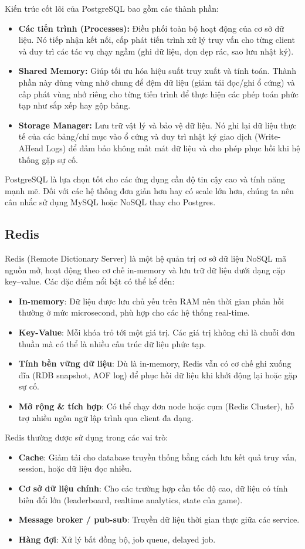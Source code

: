 Kiến trúc cốt lõi của PostgreSQL bao gồm các thành phần:
\begin{itemize}
    \item \textbf{Các tiến trình (Processes):} Điều phối toàn bộ hoạt động của cơ sở dữ liệu. Nó tiếp nhận kết nối, cấp phát tiến trình xử lý truy vấn cho từng client và duy trì các tác vụ chạy ngầm (ghi dữ liệu, dọn dẹp rác, sao lưu nhật ký).
    \item \textbf{Shared Memory:} Giúp tối ưu hóa hiệu suất truy xuất và tính toán. Thành phần này dùng vùng nhớ chung để đệm dữ liệu (giảm tải đọc/ghi ổ cứng) và cấp phát vùng nhớ riêng cho từng tiến trình để thực hiện các phép toán phức tạp như sắp xếp hay gộp bảng.
    \item \textbf{Storage Manager:} Lưu trữ vật lý và bảo vệ dữ liệu. Nó ghi lại dữ liệu thực tế của các bảng/chỉ mục vào ổ cứng và duy trì nhật ký giao dịch (Write-AHead Logs) để đảm bảo không mất mát dữ liệu và cho phép phục hồi khi hệ thống gặp sự cố.
\end{itemize}

PostgreSQL là lựa chọn tốt cho các ứng dụng cần độ tin cậy cao và tính năng
mạnh mẽ. Đối với các hệ thống đơn giản hơn hay có scale lớn hơn, chúng ta
nên cân nhắc sử dụng MySQL hoặc NoSQL thay cho Postgres.

\subsection{Redis}
Redis (Remote Dictionary Server) là một hệ quản trị cơ sở dữ liệu NoSQL mã nguồn mở, hoạt động theo cơ chế in-memory và lưu trữ dữ liệu dưới dạng cặp key–value. Các đặc điểm nổi bật có thể kể đến:
\begin{itemize}
    \item \textbf{In-memory}: Dữ liệu được lưu chủ yếu trên RAM nên thời gian phản hồi thường ở mức microsecond, phù hợp cho các hệ thống real-time.
    \item \textbf{Key-Value}: Mỗi khóa trỏ tới một giá trị. Các giá trị không chỉ là chuỗi đơn thuần mà có thể là nhiều cấu trúc dữ liệu phức tạp.
    \item \textbf{Tính bền vững dữ liệu}: Dù là in-memory, Redis vẫn có cơ chế ghi xuống đĩa (RDB snapshot, AOF log) để phục hồi dữ liệu khi khởi động lại hoặc gặp sự cố.
    \item \textbf{Mở rộng \& tích hợp}: Có thể chạy đơn node hoặc cụm (Redis Cluster), hỗ trợ nhiều ngôn ngữ lập trình qua client đa dạng.
\end{itemize}
Redis thường được sử dụng trong các vai trò:
\begin{itemize}
    \item \textbf{Cache}: Giảm tải cho database truyền thống bằng cách lưu kết quả truy vấn, session, hoặc dữ liệu đọc nhiều.
    \item \textbf{Cơ sở dữ liệu chính}: Cho các trường hợp cần tốc độ cao, dữ liệu có tính biến đổi lớn (leaderboard, realtime analytics, state của game).
    \item \textbf{Message broker / pub-sub}: Truyền dữ liệu thời gian thực giữa các service.
    \item \textbf{Hàng đợi}: Xử lý bất đồng bộ, job queue, delayed job.
\end{itemize}

